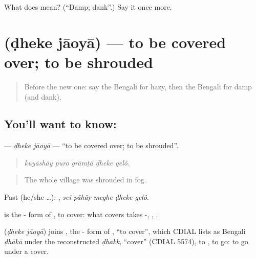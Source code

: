 \begin{tcolorbox}[breakable,colback=teal!4,colframe=teal!35!black,title={Before you move on}]
What does  mean? (\textquotedblleft{}Damp; dank\textquotedblright{}.) Say it once more.
\end{tcolorbox}
\section[\texorpdfstring{\bn{ঢেকে} \bn{যাওয়া} (ḍheke jāoyā)}{ঢেকে যাওয়া (ḍheke jāoyā)}]{  (ḍheke jāoyā) — to be covered over; to be shrouded}

\label{lesson:BN-C428-dheke-jaoya}



\begin{quote}
Before the new one: say the Bengali for hazy, then the Bengali for damp (and dank).
\end{quote}

\subsection*{You'll want to know:  }
\textbf{ } — \emph{ḍheke jāoyā} — \textquotedblleft{}to be covered over; to be shrouded\textquotedblright{}.

\begin{quote}
    
\end{quote}

\begin{quote}
\emph{kuyāshāy puro grāmṭā ḍheke gelô.}
\end{quote}

\begin{quote}
The whole village was shrouded in fog.
\end{quote}

Past (he/she …):     , \emph{sei pāhāṛ meghe ḍheke gelô}.

 is the - form of , to cover: what covers takes -, , .

\begin{cousinweb}
\textbf{ } (\emph{ḍheke jāoyā}) joins , the - form of , \textquotedblleft{}to cover\textquotedblright{}, which CDIAL lists as Bengali \emph{ḍhākā} under the reconstructed \emph{ḍhakk}, \textquotedblleft{}cover\textquotedblright{} (CDIAL 5574), to , to go: to go under a cover.
\end{cousinweb}


